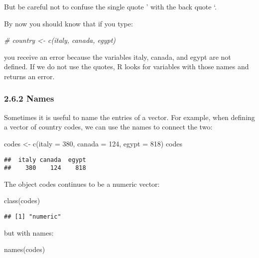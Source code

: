 \documentclass[
]{article}
\newenvironment{Shaded}{\begin{snugshade}}{\end{snugshade}}
\newcommand{\AttributeTok}[1]{\textcolor[rgb]{0.77,0.63,0.00}{#1}}
\newcommand{\CommentTok}[1]{\textcolor[rgb]{0.56,0.35,0.01}{\textit{#1}}}
\newcommand{\DecValTok}[1]{\textcolor[rgb]{0.00,0.00,0.81}{#1}}
\newcommand{\FunctionTok}[1]{\textcolor[rgb]{0.00,0.00,0.00}{#1}}
\newcommand{\NormalTok}[1]{#1}
\newcommand{\OtherTok}[1]{\textcolor[rgb]{0.56,0.35,0.01}{#1}}
\begin{document}
But be careful not to confuse the single quote ' with the back quote `.

By now you should know that if you type:

\begin{Shaded}
\begin{Highlighting}[]
\CommentTok{\# country \textless{}{-} c(italy, canada, egypt)}
\end{Highlighting}
\end{Shaded}

you receive an error because the variables italy, canada, and egypt are
not defined. If we do not use the quotes, R looks for variables with
those names and returns an error.

\hypertarget{names}{%
\subsubsection{2.6.2 Names}\label{names}}

Sometimes it is useful to name the entries of a vector. For example,
when defining a vector of country codes, we can use the names to connect
the two:

\begin{Shaded}
\begin{Highlighting}[]
\NormalTok{codes }\OtherTok{\textless{}{-}} \FunctionTok{c}\NormalTok{(}\AttributeTok{italy =} \DecValTok{380}\NormalTok{, }\AttributeTok{canada =} \DecValTok{124}\NormalTok{, }\AttributeTok{egypt =} \DecValTok{818}\NormalTok{)}
\NormalTok{codes}
\end{Highlighting}
\end{Shaded}

\begin{verbatim}
##  italy canada  egypt 
##    380    124    818
\end{verbatim}

The object codes continues to be a numeric vector:

\begin{Shaded}
\begin{Highlighting}[]
\FunctionTok{class}\NormalTok{(codes)}
\end{Highlighting}
\end{Shaded}

\begin{verbatim}
## [1] "numeric"
\end{verbatim}

but with names:

\begin{Shaded}
\begin{Highlighting}[]
\FunctionTok{names}\NormalTok{(codes)}
\end{Highlighting}
\end{Shaded}
\end{document}
